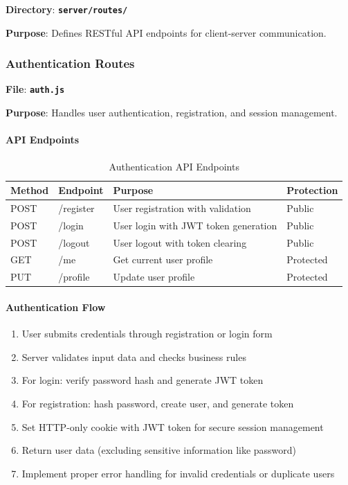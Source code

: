 \documentclass[12pt,a4paper]{article}
\newcommand{\file}[1]{\textbf{\texttt{#1}}}
\begin{document}
\textbf{Directory}: \file{server/routes/}

\textbf{Purpose}: Defines RESTful API endpoints for client-server communication.

\subsubsection{Authentication Routes}
\label{subsubsec:auth-routes}

\textbf{File}: \file{auth.js}

\textbf{Purpose}: Handles user authentication, registration, and session management.

\paragraph{API Endpoints}
\begin{table}[H]
\centering
\small
\begin{tabular}{@{}llll@{}}
\toprule
\textbf{Method} & \textbf{Endpoint} & \textbf{Purpose} & \textbf{Protection} \\
\midrule
POST & /register & User registration with validation & Public \\
POST & /login & User login with JWT token generation & Public \\
POST & /logout & User logout with token clearing & Public \\
GET & /me & Get current user profile & Protected \\
PUT & /profile & Update user profile & Protected \\
\bottomrule
\end{tabular}
\caption{Authentication API Endpoints}
\label{tab:auth-endpoints}
\end{table}

\paragraph{Authentication Flow}
\begin{enumerate}
\item User submits credentials through registration or login form
\item Server validates input data and checks business rules
\item For login: verify password hash and generate JWT token
\item For registration: hash password, create user, and generate token
\item Set HTTP-only cookie with JWT token for secure session management
\item Return user data (excluding sensitive information like password)
\item Implement proper error handling for invalid credentials or duplicate users
\end{enumerate}
\end{document}
